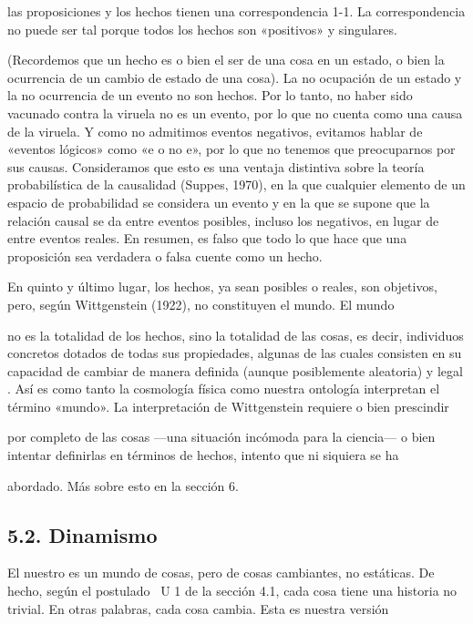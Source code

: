 \begin{justifying}
\begin{justifying}
las proposiciones y los hechos tienen una correspondencia 1-1. La correspondencia
no puede ser tal porque todos los hechos son «positivos» y singulares.

(Recordemos que un hecho es o bien el ser de una cosa en un estado, o bien la
ocurrencia de un cambio de estado de una cosa). La no ocupación de un estado
y la no ocurrencia de un evento no son hechos. Por lo tanto, no haber sido
vacunado contra la viruela no es un evento, por lo que no cuenta como una
causa de la viruela. Y como no admitimos eventos negativos,
evitamos hablar de «eventos lógicos» como «e o no e», por lo que no
tenemos que preocuparnos por sus causas. Consideramos que esto es una ventaja distintiva
sobre la teoría probabilística de la causalidad (Suppes, 1970),
en la que cualquier elemento de un espacio de probabilidad se considera un evento y en la que
se supone que la relación causal se da entre eventos posibles, incluso
los negativos, en lugar de entre eventos reales. En resumen, es falso que
todo lo que hace que una proposición sea verdadera o falsa cuente como un hecho.

En quinto y último lugar, los hechos, ya sean posibles o reales, son objetivos, pero,
según Wittgenstein (1922), no constituyen el mundo. El mundo

no es la totalidad de los hechos, sino la totalidad de las cosas, es decir, individuos concretos
dotados de todas sus propiedades, algunas de las cuales consisten en
su capacidad de cambiar de manera definida (aunque posiblemente aleatoria) y legal
. Así es como tanto la cosmología física como nuestra ontología interpretan
el término «mundo». La interpretación de Wittgenstein requiere o bien prescindir

por completo de las cosas —una situación incómoda para la ciencia— o bien intentar
definirlas en términos de hechos, intento que ni siquiera se ha

abordado. Más sobre esto en la sección 6.

    \noindent 
\bigskip
\subsection{5.2. Dinamismo}

El nuestro es un mundo de cosas, pero de cosas cambiantes, no estáticas.
De hecho, según el postulado ~U 1 de la sección 4.1, cada cosa tiene una
historia no trivial. En otras palabras, cada cosa cambia. Esta es nuestra versión


\end{justifying}
\end{justifying}
